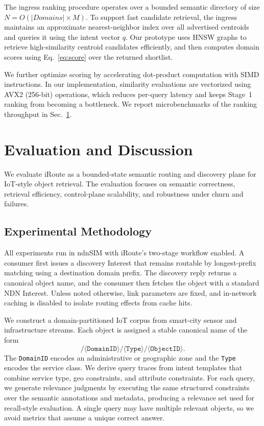 \documentclass[journal]{IEEEtran}
\newcommand{\sysname}{iRoute}
\begin{document}
The ingress ranking procedure operates over a bounded semantic directory of size $N = O(|Domains| \times M)$.
To support fast candidate retrieval, the ingress maintains an approximate nearest-neighbor index over all advertised centroids and queries it using the intent vector $q$.
Our prototype uses HNSW graphs to retrieve high-similarity centroid candidates efficiently, and then computes domain scores using Eq.~\ref{eq:score} over the returned shortlist.

We further optimize scoring by accelerating dot-product computation with SIMD instructions.
In our implementation, similarity evaluations are vectorized using AVX2 (256-bit) operations, which reduces per-query latency and keeps Stage~1 ranking from becoming a bottleneck.
We report microbenchmarks of the ranking throughput in Sec.~\ref{sec:eval}.


\section{Evaluation and Discussion}
\label{sec:eval}

We evaluate \sysname{} as a bounded-state semantic routing and discovery plane for IoT-style object retrieval.
The evaluation focuses on semantic correctness, retrieval efficiency, control-plane scalability, and robustness under churn and failures.

\subsection{Experimental Methodology}
\label{sec:eval_setup}

All experiments run in ndnSIM with \sysname{}'s two-stage workflow enabled.
A consumer first issues a discovery Interest that remains routable by longest-prefix matching using a destination domain prefix.
The discovery reply returns a canonical object name, and the consumer then fetches the object with a standard NDN Interest.
Unless noted otherwise, link parameters are fixed, and in-network caching is disabled to isolate routing effects from cache hits.

We construct a domain-partitioned IoT corpus from smart-city sensor and infrastructure streams.
Each object is assigned a stable canonical name of the form
\[
\texttt{/}\langle \texttt{DomainID}\rangle\texttt{/}\langle \texttt{Type}\rangle\texttt{/}\langle \texttt{ObjectID}\rangle.
\]
The \texttt{DomainID} encodes an administrative or geographic zone and the \texttt{Type} encodes the service class.
We derive query traces from intent templates that combine service type, geo constraints, and attribute constraints.
For each query, we generate relevance judgments by executing the same structured constraints over the semantic annotations and metadata, producing a relevance set used for recall-style evaluation.
A single query may have multiple relevant objects, so we avoid metrics that assume a unique correct answer.
\end{document}
